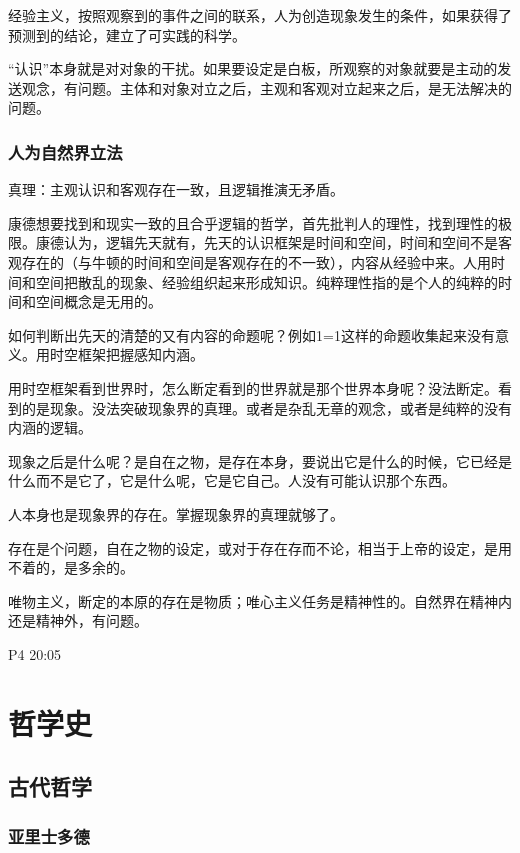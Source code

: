 \documentclass[UTF8]{../RepresentationUniverse}
\begin{document}
经验主义，按照观察到的事件之间的联系，人为创造现象发生的条件，如果获得了预测到的结论，建立了可实践的科学。

“认识”本身就是对对象的干扰。如果要设定是白板，所观察的对象就要是主动的发送观念，有问题。主体和对象对立之后，主观和客观对立起来之后，是无法解决的问题。

\subsection{人为自然界立法}



真理：主观认识和客观存在一致，且逻辑推演无矛盾。

康德想要找到和现实一致的且合乎逻辑的哲学，首先批判人的理性，找到理性的极限。康德认为，逻辑先天就有，先天的认识框架是时间和空间，时间和空间不是客观存在的（与牛顿的时间和空间是客观存在的不一致），内容从经验中来。人用时间和空间把散乱的现象、经验组织起来形成知识。纯粹理性指的是个人的纯粹的时间和空间概念是无用的。

如何判断出先天的清楚的又有内容的命题呢？例如1=1这样的命题收集起来没有意义。用时空框架把握感知内涵。

用时空框架看到世界时，怎么断定看到的世界就是那个世界本身呢？没法断定。看到的是现象。没法突破现象界的真理。或者是杂乱无章的观念，或者是纯粹的没有内涵的逻辑。

现象之后是什么呢？是自在之物，是存在本身，要说出它是什么的时候，它已经是什么而不是它了，它是什么呢，它是它自己。人没有可能认识那个东西。

人本身也是现象界的存在。掌握现象界的真理就够了。

存在是个问题，自在之物的设定，或对于存在存而不论，相当于上帝的设定，是用不着的，是多余的。


唯物主义，断定的本原的存在是物质；唯心主义任务是精神性的。自然界在精神内还是精神外，有问题。

P4 20:05






\chapter{哲学史}
\section{古代哲学}
    \subsection{亚里士多德}
\end{document}
